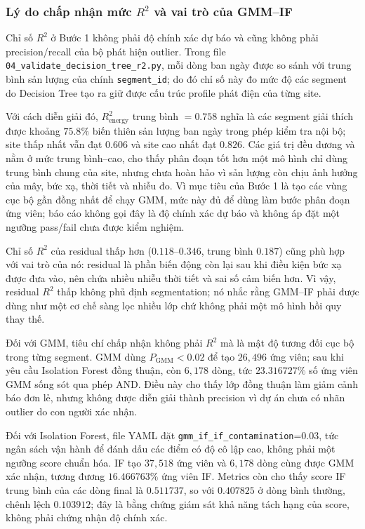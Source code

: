 \documentclass[12pt,a4paper]{article}
\begin{document}
\subsubsection{Lý do chấp nhận mức $R^2$ và vai trò của GMM--IF}
Chỉ số $R^2$ ở Bước 1 không phải độ chính xác dự báo và cũng không phải precision/recall của bộ phát hiện outlier. Trong file \texttt{04\_validate\_decision\_tree\_r2.py}, mỗi dòng ban ngày được so sánh với trung bình sản lượng của chính \texttt{segment\_id}; do đó chỉ số này đo mức độ các segment do Decision Tree tạo ra giữ được cấu trúc profile phát điện của từng site.

Với cách diễn giải đó, $R^2_{\text{energy}}$ trung bình $=0.758$ nghĩa là các segment giải thích được khoảng $75.8\%$ biến thiên sản lượng ban ngày trong phép kiểm tra nội bộ; site thấp nhất vẫn đạt $0.606$ và site cao nhất đạt $0.826$. Các giá trị đều dương và nằm ở mức trung bình--cao, cho thấy phân đoạn tốt hơn một mô hình chỉ dùng trung bình chung của site, nhưng chưa hoàn hảo vì sản lượng còn chịu ảnh hưởng của mây, bức xạ, thời tiết và nhiễu đo. Vì mục tiêu của Bước 1 là tạo các vùng cục bộ gần đồng nhất để chạy GMM, mức này đủ để dùng làm bước phân đoạn ứng viên; báo cáo không gọi đây là độ chính xác dự báo và không áp đặt một ngưỡng pass/fail chưa được kiểm nghiệm.

Chỉ số $R^2$ của residual thấp hơn ($0.118$--$0.346$, trung bình $0.187$) cũng phù hợp với vai trò của nó: residual là phần biến động còn lại sau khi điều kiện bức xạ được đưa vào, nên chứa nhiều nhiễu thời tiết và sai số cảm biến hơn. Vì vậy, residual $R^2$ thấp không phủ định segmentation; nó nhắc rằng GMM--IF phải được dùng như một cơ chế sàng lọc nhiều lớp chứ không phải một mô hình hồi quy thay thế.

Đối với GMM, tiêu chí chấp nhận không phải $R^2$ mà là mật độ tương đối cục bộ trong từng segment. GMM dùng $P_{\text{GMM}}<0.02$ để tạo $26{,}496$ ứng viên; sau khi yêu cầu Isolation Forest đồng thuận, còn $6{,}178$ dòng, tức $23.316727\%$ số ứng viên GMM sống sót qua phép AND. Điều này cho thấy lớp đồng thuận làm giảm cảnh báo đơn lẻ, nhưng không được diễn giải thành precision vì dự án chưa có nhãn outlier do con người xác nhận.

Đối với Isolation Forest, file YAML đặt \texttt{gmm\_if\_if\_contamination}=0.03, tức ngân sách vận hành để đánh dấu các điểm có độ cô lập cao, không phải một ngưỡng score chuẩn hóa. IF tạo $37{,}518$ ứng viên và $6{,}178$ dòng cùng được GMM xác nhận, tương đương $16.466763\%$ ứng viên IF. Metrics còn cho thấy score IF trung bình của các dòng final là $0.511737$, so với $0.407825$ ở dòng bình thường, chênh lệch $0.103912$; đây là bằng chứng giám sát khả năng tách hạng của score, không phải chứng nhận độ chính xác.
\end{document}
